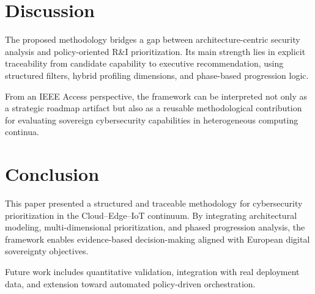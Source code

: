 \documentclass{ieeeaccess}
\begin{document}
\fi

\section{Discussion}

The proposed methodology bridges a gap between architecture-centric security analysis and policy-oriented R\&I prioritization. Its main strength lies in explicit traceability from candidate capability to executive recommendation, using structured filters, hybrid profiling dimensions, and phase-based progression logic.

From an IEEE Access perspective, the framework can be interpreted not only as a strategic roadmap artifact but also as a reusable methodological contribution for evaluating sovereign cybersecurity capabilities in heterogeneous computing continua.

\section{Conclusion}

This paper presented a structured and traceable methodology for cybersecurity prioritization in the Cloud--Edge--IoT continuum. By integrating architectural modeling, multi-dimensional prioritization, and phased progression analysis, the framework enables evidence-based decision-making aligned with European digital sovereignty objectives.

Future work includes quantitative validation, integration with real deployment data, and extension toward automated policy-driven orchestration.



\end{document}
